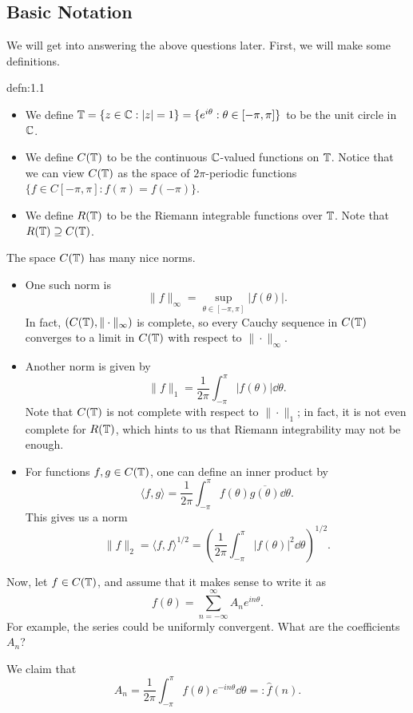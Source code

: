 \subsection{Basic Notation}
We will get into answering the above questions later. First, we will make 
some definitions.

\begin{defn}{defn:1.1}
    \begin{itemize}
        \item We define $\mathbb{T} = \{z \in \mathbb{C} : |z| = 1\} = 
        \{e^{i\theta} : \theta \in [-\pi, \pi]\}$ to be the unit circle in $\mathbb{C}$. 
        \item We define $C(\mathbb{T})$ to be the continuous $\mathbb{C}$-valued functions 
        on $\mathbb{T}$. Notice that we can view $C(\mathbb{T})$ as the space of
        $2\pi$-periodic functions $\{f \in C[-\pi, \pi] : f(\pi) = f(-\pi)\}$.
        \item We define $R(\mathbb{T})$ to be the Riemann integrable functions 
        over $\mathbb{T}$. Note that $R(\mathbb{T}) \supseteq C(\mathbb{T})$. 
    \end{itemize}
\end{defn}

The space $C(\mathbb{T})$ has many nice norms. 
\begin{itemize}
    \item One such norm is 
    \[ \|f\|_\infty = \sup_{\theta \in [-\pi, \pi]} |f(\theta)|. \] 
    In fact, $(C(\mathbb{T}), \|\cdot\|_\infty)$ is complete, so every 
    Cauchy sequence in $C(\mathbb{T})$ converges to a limit in $C(\mathbb{T})$ with respect to 
    $\|\cdot\|_\infty$.
    \item Another norm is given by 
    \[ \|f\|_1 = \frac{1}{2\pi} \int_{-\pi}^\pi |f(\theta)|\dd\theta. \] 
    Note that $C(\mathbb{T})$ is not complete with respect to $\|\cdot\|_1$; 
    in fact, it is not even complete for $R(\mathbb{T})$, which hints to us that 
    Riemann integrability may not be enough. 
    \item For functions $f, g \in C(\mathbb{T})$, one can define an inner product by 
    \[ \langle f, g \rangle = \frac{1}{2\pi} \int_{-\pi}^\pi f(\theta) 
    \overline{g(\theta)}\dd\theta. \] 
    This gives us a norm 
    \[ \|f\|_2 = \langle f, f \rangle^{1/2} = 
    \left( \frac{1}{2\pi} \int_{-\pi}^\pi |f(\theta)|^2\dd\theta \right)^{\!1/2}. \] 
\end{itemize} 
Now, let $f \in C(\mathbb{T})$, and assume that it makes sense to write it as 
\[ f(\theta) = \sum_{n=-\infty}^\infty A_n e^{in\theta}. \] 
For example, the series could be uniformly convergent. What are the 
coefficients $A_n$?

We claim that 
\[ A_n = \frac{1}{2\pi} \int_{-\pi}^\pi f(\theta) e^{-in\theta}\dd\theta 
=: \hat f(n). \] 
